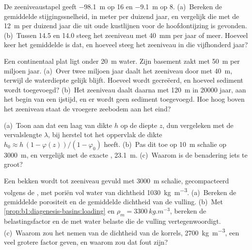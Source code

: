 \begin{exercise}[$\star\star$]\label{exo:b1:diagenesis-basins:8}
De zeeniveaustapel geeft \qty{-98.1}{m} op \qty{16}{\ka} en \qty{-9.1}{m} op \qty{8}{\ka}. (a)~Bereken de gemiddelde stijgingssnelheid, in meter per duizend jaar, en vergelijk die met de \qty{12}{m} per duizend jaar die uit oude kustlijnen voor de hoofdontijzing is gevonden. (b)~Tussen \qty{14.5}{\ka} en \qty{14.0}{\ka} steeg het zeeniveau met \qty{40}{mm} per jaar of meer. Hoeveel keer het gemiddelde is dat, en hoeveel steeg het zeeniveau in die vijfhonderd jaar?
\end{exercise}

\begin{exercise}[$\star\star$]\label{exo:b1:diagenesis-basins:9}
Een continentaal plat ligt onder \qty{20}{m} water. Zijn basement zakt met \qty{50}{m} per miljoen jaar. (a)~Over twee miljoen jaar daalt het zeeniveau door  met \qty{40}{m}, terwijl de waterdiepte gelijk blijft. Hoeveel  wordt gecreëerd, en hoeveel sediment wordt toegevoegd? (b)~Het zeeniveau daalt daarna met \qty{120}{m} in \num{20000} jaar, aan het begin van een ijstijd, en er wordt geen sediment toegevoegd. Hoe hoog boven het zeeniveau staat de vroegere zeebodem aan het eind?
\end{exercise}

\begin{exercise}[$\star\star\star$]\label{exo:b1:diagenesis-basins:10}
(a)~Toon aan dat een laag van dikte $h$ op de diepte $z$, dun vergeleken met de vervalslengte $\lambda$, bij herstel tot het oppervlak de dikte $h_0 \approx h\,(1 - \varphi(z))/(1 -
\varphi_0)$ heeft. (b)~Pas dit toe op \qty{10}{m} schalie op \qty{3000}{m}, en vergelijk met de exacte , \qty{23.1}{m}. (c)~Waarom is de benadering iets te groot?
\end{exercise}

\begin{exercise}[$\star\star\star$]\label{exo:b1:diagenesis-basins:11}
Een bekken wordt tot zeeniveau gevuld met \qty{3000}{m} schalie, gecompacteerd volgens de , met poriën vol water van dichtheid \qty{1030}{kg.m^{-3}}. (a)~Bereken de gemiddelde porositeit en de gemiddelde dichtheid van de vulling. (b)~Met \cref{prop:b1:diagenesis-basins:loading} en $\rho_m =
\qty{3300}{kg.m^{-3}}$, bereken de belastingsfactor en de met water belaste  die de vulling vertegenwoordigt. (c)~Waarom zou het nemen van de dichtheid van de korrels, \qty{2700}{kg.m^{-3}}, een veel grotere factor geven, en waarom zou dat fout zijn?
\end{exercise}

